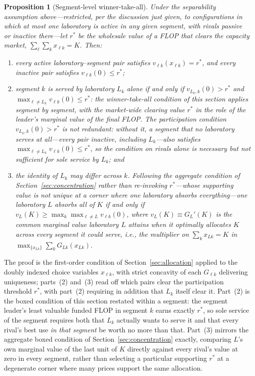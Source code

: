 \documentclass[11pt]{article}
\newtheorem{proposition}{Proposition}
\begin{document}
\begin{proposition}[Segment-level winner-take-all]
\label{prop:segment-wta}
Under the separability assumption above---restricted, per the discussion just given, to configurations in which at most one laboratory is active in any given segment, with rivals passive or inactive there---let $r^*$ be the wholesale value of a FLOP that clears the capacity market, $\sum_\ell\sum_k x_{\ell k}=K$. Then:
\begin{enumerate}
\item every active laboratory--segment pair satisfies $v_{\ell k}(x_{\ell k})=r^*$, and every inactive pair satisfies $v_{\ell k}(0)\leq r^*$;
\item segment $k$ is served by laboratory $L_k$ alone if and only if $v_{L_k,k}(0)>r^*$ \emph{and} $\max_{\ell\neq L_k}v_{\ell k}(0)\leq r^*$: the winner-take-all condition of this section applies segment by segment, with the market-wide clearing value $r^*$ in the role of the leader's marginal value of the final FLOP. The participation condition $v_{L_k,k}(0)>r^*$ is not redundant: without it, a segment that no laboratory serves at all---every pair inactive, including $L_k$---also satisfies $\max_{\ell\neq L_k}v_{\ell k}(0)\leq r^*$, so the condition on rivals alone is necessary but not sufficient for sole service by $L_k$; and
\item the identity of $L_k$ may differ across $k$. Following the aggregate condition of Section~\ref{sec:concentration} rather than re-invoking $r^*$---whose supporting value is not unique at a corner where one laboratory absorbs everything---one laboratory $L$ absorbs all of $K$ if and only if $v_L(K)\geq\max_k\max_{\ell\neq L}v_{\ell k}(0)$, where $v_L(K)\equiv G_L'(K)$ is the common marginal value laboratory $L$ attains when it optimally allocates $K$ across every segment it could serve, i.e., the multiplier on $\sum_k x_{Lk}=K$ in $\max_{\{x_{Lk}\}}\sum_k G_{Lk}(x_{Lk})$.
\end{enumerate}
\end{proposition}

The proof is the first-order condition of Section~\ref{sec:allocation} applied to the doubly indexed choice variables $x_{\ell k}$, with strict concavity of each $G_{\ell k}$ delivering uniqueness; parts~(2) and~(3) read off which pairs clear the participation threshold $r^*$, with part~(2) requiring in addition that $L_k$ itself clear it. Part~(2) is the boxed condition of this section restated within a segment: the segment leader's least valuable funded FLOP in segment $k$ earns exactly $r^*$, so sole service of the segment requires both that $L_k$ actually wants to serve it and that every rival's best use \emph{in that segment} be worth no more than that. Part~(3) mirrors the aggregate boxed condition of Section~\ref{sec:concentration} exactly, comparing $L$'s own marginal value of the last unit of $K$ directly against every rival's value at zero in every segment, rather than selecting a particular supporting $r^*$ at a degenerate corner where many prices support the same allocation.
\end{document}
